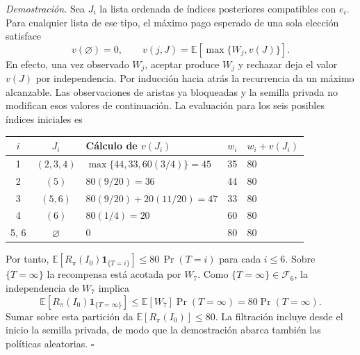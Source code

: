 \documentclass[11pt,a4paper]{article}
\newcommand{\E}{\mathbb{E}}
\newenvironment{prueba}[1][Demostración]{\par\smallskip\noindent\textit{#1.}\enspace}{\unskip\nobreak\hfill\(\square\)\par\smallskip}
\newcommand{\F}{\mathcal F}
\begin{document}
\begin{prueba}
Sea \(J_i\) la lista ordenada de índices posteriores compatibles con \(e_i\). Para cualquier lista de ese tipo, el máximo pago esperado de una sola elección satisface
\[
 v(\varnothing)=0,\qquad
 v(j,J)=\E[\max\{W_j,v(J)\}].
\]
En efecto, una vez observado \(W_j\), aceptar produce \(W_j\) y rechazar deja el valor \(v(J)\) por independencia. Por inducción hacia atrás la recurrencia da un máximo alcanzable. Las observaciones de aristas ya bloqueadas y la semilla privada no modifican esos valores de continuación. La evaluación para los seis posibles índices iniciales es
\begin{center}
\begin{tabular}{@{}cclcl@{}}\toprule
\(i\)& \(J_i\)&Cálculo de \(v(J_i)\)& \(w_i\)& \(w_i+v(J_i)\)\\\midrule
1 & \((2,3,4)\)& \(\max\{44,33,60(3/4)\}=45\)&35&80\\
2 & \((5)\)& \(80(9/20)=36\)&44&80\\
3 & \((5,6)\)& \(80(9/20)+20(11/20)=47\)&33&80\\
4 & \((6)\)& \(80(1/4)=20\)&60&80\\
5, 6 & \(\varnothing\)& \(0\)&80&80\\\bottomrule
\end{tabular}
\end{center}
Por tanto, \(\E[R_\pi(I_0)\mathbf 1_{\{T=i\}}]\leq80\,\Pr(T=i)\) para cada \(i\leq6\). Sobre \(\{T=\infty\}\) la recompensa está acotada por \(W_7\). Como \(\{T=\infty\}\in\F_6\), la independencia de \(W_7\) implica
\[
 \E[R_\pi(I_0)\mathbf 1_{\{T=\infty\}}]\leq
 \E[W_7]\Pr(T=\infty)=80\Pr(T=\infty).
\]
Sumar sobre esta partición da \(\E[R_\pi(I_0)]\leq80\). La filtración incluye desde el inicio la semilla privada, de modo que la demostración abarca también las políticas aleatorias.
\end{prueba}

\clearpage
\end{document}
